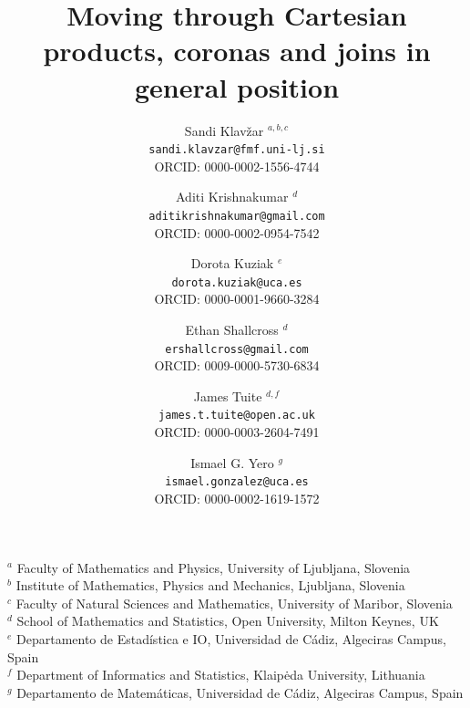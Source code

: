 \documentclass[a4paper,12pt]{article}
\theoremstyle{definition}
\begin{document}
	
	\title{Moving through Cartesian products, coronas and joins in general position}
	\author{Sandi Klav\v{z}ar $^{a,b,c}$ \\ \texttt{\footnotesize sandi.klavzar@fmf.uni-lj.si}  \\
		{\footnotesize ORCID: 0000-0002-1556-4744}
		\and
		Aditi Krishnakumar $^{d}$ \\ \texttt{\footnotesize aditikrishnakumar@gmail.com} \\
		{\footnotesize ORCID: 0000-0002-0954-7542}
		\and
		Dorota Kuziak $^{e}$ \\ \texttt{\footnotesize dorota.kuziak@uca.es} \\ 
		{\footnotesize ORCID: 
			0000-0001-9660-3284}
		\and
		Ethan Shallcross $^{d}$ \\ \texttt{\footnotesize ershallcross@gmail.com} \\ 
		{\footnotesize ORCID: 
			0009-0000-5730-6834}
		\and 
		James Tuite $^{d,f}$ \\ \texttt{\footnotesize james.t.tuite@open.ac.uk} \\ 
		{\footnotesize ORCID: 
			0000-0003-2604-7491}
		\and 
		Ismael G. Yero $^{g}$ \\ \texttt{\footnotesize ismael.gonzalez@uca.es} \\
		{\footnotesize ORCID: 0000-0002-1619-1572}
	}
	
	\maketitle
	
	\begin{center}
		$^a$ Faculty of Mathematics and Physics, University of Ljubljana, Slovenia\\
		
		$^b$ Institute of Mathematics, Physics and Mechanics, Ljubljana, Slovenia\\
		
		$^c$ Faculty of Natural Sciences and Mathematics, University of Maribor, Slovenia\\
		
		$^d$ School of Mathematics and Statistics, Open University, Milton Keynes, UK\\
		
		$^e$ Departamento de Estad\'istica e IO, Universidad de C\'adiz, Algeciras Campus, Spain\\
		
		$^f$ Department of Informatics and Statistics, Klaip\.{e}da University, Lithuania\\
		
		$^g$ Departamento de Matem\'aticas, Universidad de C\'adiz, Algeciras Campus, Spain
	\end{center}
	
\end{document}
